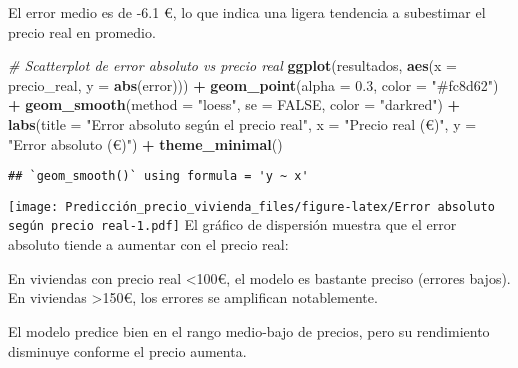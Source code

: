 \documentclass[
]{article}
\newenvironment{Shaded}{\begin{snugshade}}{\end{snugshade}}
\newcommand{\AttributeTok}[1]{\textcolor[rgb]{0.13,0.29,0.53}{#1}}
\newcommand{\CommentTok}[1]{\textcolor[rgb]{0.56,0.35,0.01}{\textit{#1}}}
\newcommand{\ConstantTok}[1]{\textcolor[rgb]{0.56,0.35,0.01}{#1}}
\newcommand{\FloatTok}[1]{\textcolor[rgb]{0.00,0.00,0.81}{#1}}
\newcommand{\FunctionTok}[1]{\textcolor[rgb]{0.13,0.29,0.53}{\textbf{#1}}}
\newcommand{\NormalTok}[1]{#1}
\newcommand{\SpecialCharTok}[1]{\textcolor[rgb]{0.81,0.36,0.00}{\textbf{#1}}}
\newcommand{\StringTok}[1]{\textcolor[rgb]{0.31,0.60,0.02}{#1}}
\begin{document}
El error medio es de -6.1 €, lo que indica una ligera tendencia a
subestimar el precio real en promedio.

\begin{Shaded}
\begin{Highlighting}[]
\CommentTok{\# Scatterplot de error absoluto vs precio real}
\FunctionTok{ggplot}\NormalTok{(resultados, }\FunctionTok{aes}\NormalTok{(}\AttributeTok{x =}\NormalTok{ precio\_real, }\AttributeTok{y =} \FunctionTok{abs}\NormalTok{(error))) }\SpecialCharTok{+}
  \FunctionTok{geom\_point}\NormalTok{(}\AttributeTok{alpha =} \FloatTok{0.3}\NormalTok{, }\AttributeTok{color =} \StringTok{"\#fc8d62"}\NormalTok{) }\SpecialCharTok{+}
  \FunctionTok{geom\_smooth}\NormalTok{(}\AttributeTok{method =} \StringTok{"loess"}\NormalTok{, }\AttributeTok{se =} \ConstantTok{FALSE}\NormalTok{, }\AttributeTok{color =} \StringTok{"darkred"}\NormalTok{) }\SpecialCharTok{+}
  \FunctionTok{labs}\NormalTok{(}\AttributeTok{title =} \StringTok{"Error absoluto según el precio real"}\NormalTok{,}
       \AttributeTok{x =} \StringTok{"Precio real (€)"}\NormalTok{,}
       \AttributeTok{y =} \StringTok{"Error absoluto (€)"}\NormalTok{) }\SpecialCharTok{+}
  \FunctionTok{theme\_minimal}\NormalTok{()}
\end{Highlighting}
\end{Shaded}

\begin{verbatim}
## `geom_smooth()` using formula = 'y ~ x'
\end{verbatim}

\texttt{[image: Predicción\_precio\_vivienda\_files/figure-latex/Error absoluto según precio real-1.pdf]}
El gráfico de dispersión muestra que el error absoluto tiende a aumentar
con el precio real:

En viviendas con precio real \textless100€, el modelo es bastante
preciso (errores bajos). En viviendas \textgreater150€, los errores se
amplifican notablemente.

El modelo predice bien en el rango medio-bajo de precios, pero su
rendimiento disminuye conforme el precio aumenta.
\end{document}

